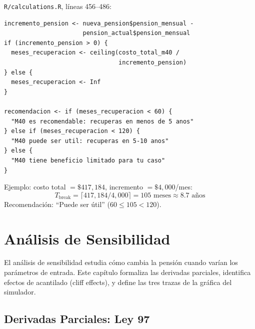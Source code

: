 \documentclass[11pt,a4paper]{report}
\theoremstyle{remark}
\begin{document}
\begin{tcolorbox}[colback=orange!5!white, colframe=orange!75!black, title=\textbf{Aplicaci\'on en C\'odigo}]
\texttt{R/calculations.R}, l\'ineas 456--486:
\begin{lstlisting}
incremento_pension <- nueva_pension$pension_mensual -
                      pension_actual$pension_mensual
if (incremento_pension > 0) {
  meses_recuperacion <- ceiling(costo_total_m40 /
                                incremento_pension)
} else {
  meses_recuperacion <- Inf
}

recomendacion <- if (meses_recuperacion < 60) {
  "M40 es recomendable: recuperas en menos de 5 anos"
} else if (meses_recuperacion < 120) {
  "M40 puede ser util: recuperas en 5-10 anos"
} else {
  "M40 tiene beneficio limitado para tu caso"
}
\end{lstlisting}

Ejemplo: costo total $= \$417{,}184$, incremento $= \$4{,}000$/mes:
\[
T_{\text{break}} = \lceil 417{,}184 / 4{,}000 \rceil = 105 \text{ meses} \approx 8.7 \text{ a\~nos}
\]
Recomendaci\'on: ``Puede ser \'util'' ($60 \leq 105 < 120$).
\end{tcolorbox}


\chapter{An\'alisis de Sensibilidad}

El an\'alisis de sensibilidad estudia c\'omo cambia la pensi\'on cuando var\'ian los par\'ametros de entrada. Este cap\'itulo formaliza las derivadas parciales, identifica efectos de acantilado (cliff effects), y define las tres trazas de la gr\'afica del simulador.

\section{Derivadas Parciales: Ley 97}
\end{document}
